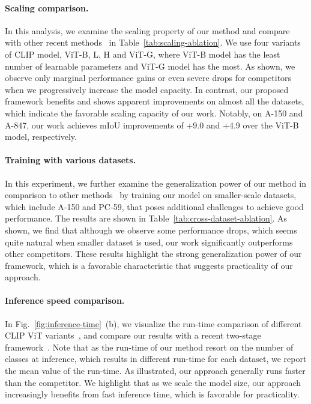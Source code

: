 \documentclass[10pt,twocolumn,letterpaper]{article}
\begin{document}
\paragraph{Scaling comparison.}
In this analysis, we examine the scaling property of our method and compare with other recent methods~\cite{ding2022decoupling,xu2022simple} in Table~\ref{tab:scaling-ablation}. We use four variants of CLIP model, ViT-B, L, H and ViT-G, where ViT-B model has the least number of learnable parameters and ViT-G model has the most. As shown, we observe only marginal performance gains or even severe drops for competitors when we progressively increase the model capacity. In contrast, our proposed framework benefits and shows apparent improvements on almost all the datasets, which indicate the favorable scaling capacity of our work. Notably, on A-150 and A-847, our work achieves mIoU improvements of +9.0 and +4.9 over the ViT-B model, respectively.
\vspace{-10pt}
\paragraph{Training with various datasets.}
In this experiment, we further examine the generalization power of our method in comparison to other methods~\cite{ding2022decoupling, xu2022simple} by training our model on smaller-scale datasets, which include A-150 and PC-59, that poses additional challenges to achieve good performance.  The results are shown in Table~\ref{tab:cross-dataset-ablation}. As shown, we find that although we observe some performance drops, which seems quite natural when smaller dataset is used, our work significantly outperforms other competitors. These results highlight the strong generalization power of our framework, which is a favorable characteristic that suggests practicality of our approach.

\vspace{-10pt}
\paragraph{Inference speed comparison.}
In Fig.~\ref{fig:inference-time}~(b), we visualize the run-time comparison of different CLIP ViT variants~\cite{radford2021learning}, and compare our results with a recent  two-stage framework~\cite{ding2022decoupling}. Note that as the run-time of our method resort on the number of classes at inference, which results in different run-time for each dataset, we report the mean value of the run-time. As illustrated,  our approach generally runs faster than the competitor. We highlight that as we scale the model size, our approach increasingly benefits from fast inference time, which is favorable for practicality.
\end{document}

